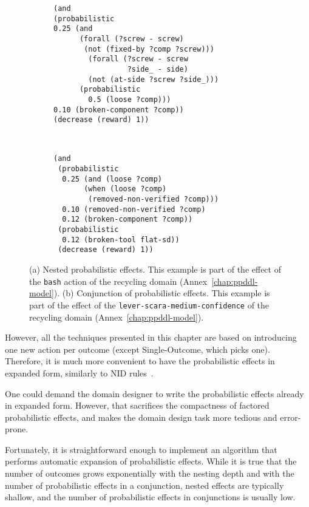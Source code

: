 \documentclass[../root.tex]{subfiles}
\begin{document}
\begin{figure}[tbhp]
\centering
\begin{subfigure}[b]{0.48\columnwidth}
\begin{lstlisting}[numbers=none]
(and
(probabilistic
0.25 (and
      (forall (?screw - screw)
       (not (fixed-by ?comp ?screw)))
        (forall (?screw - screw
                 ?side_ - side)
        (not (at-side ?screw ?side_)))
      (probabilistic 
        0.5 (loose ?comp)))
0.10 (broken-component ?comp))
(decrease (reward) 1))
\end{lstlisting}
\caption{}
\label{fig:nested-probabilistic}
\end{subfigure}
~
\begin{subfigure}[b]{0.48\columnwidth}
\begin{lstlisting}[numbers=none]
(and
 (probabilistic
  0.25 (and (loose ?comp)
       (when (loose ?comp)
        (removed-non-verified ?comp)))
  0.10 (removed-non-verified ?comp)
  0.12 (broken-component ?comp))
 (probabilistic
  0.12 (broken-tool flat-sd))
 (decrease (reward) 1))
\end{lstlisting}
\caption{}
\label{fig:conjunction-probabilistic}
\end{subfigure}
\caption{
	(a) Nested probabilistic effects. This example is part
	of the effect of the
	\texttt{bash} action of the recycling domain
	(Annex~\ref{chap:ppddl-model}).
	(b) Conjunction of probabilistic effects. This example is part
	of the effect of the \texttt{lever-scara-medium-confidence} of
	the recycling domain (Annex~\ref{chap:ppddl-model}).
}
\label{fig:non-expanded-probabilistic}
\end{figure}

However, all the techniques presented in this chapter are based on
introducing one new action per outcome (except Single-Outcome, which
picks one). Therefore, it is much more convenient to have the
probabilistic effects in expanded form, similarly to
NID rules~\cite{martinez2017relational}.

One could demand the domain designer to write the probabilistic
effects already in expanded form. However, that sacrifices the
compactness of factored probabilistic effects, and makes the domain
design task more tedious and error-prone.

Fortunately, it is straightforward enough to implement an algorithm
that performs automatic expansion of probabilistic effects. While
it is true that the number of outcomes grows exponentially with the
nesting depth and with the number of probabilistic effects in
a conjunction, nested effects are typically shallow, and the number
of probabilistic effects in conjunctions is usually low.
\end{document}
